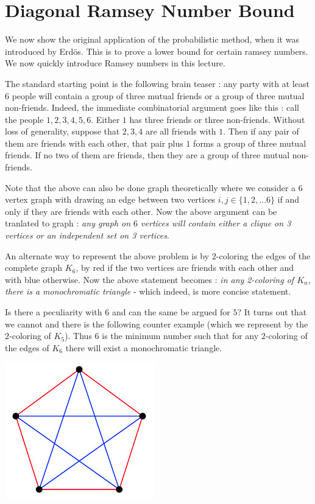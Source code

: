 \section{Diagonal Ramsey Number Bound}

We now show the original application of the probabilistic method, when it was introduced by Erd\"os. This is to prove a lower bound for certain ramsey numbers. We now quickly introduce Ramsey numbers in this lecture.

The standard starting point is the following brain teaser : any party with at least $6$ people will contain a group of three mutual friends or a group of three mutual non-friends. Indeed, the immediate combinatorial argument goes like this : call the people $1, 2, 3, 4, 5, 6$. Either $1$ has three friends or three non-friends. Without loss of generality, suppose that $2,3,4$ are all friends with $1$. Then if any pair of them are friends with each other, that pair plus $1$ forms a group of three mutual friends. If no two of them are friends, then they are a group of three mutual non-friends. 

Note that the above can also be done graph theoretically where we consider a 6 vertex graph with drawing an edge between two vertices $i,j \in \{1,2,\ldots 6\}$ if and only if they are friends with each other. Now the above argument can be tranlated to graph : \textit{any graph on $6$ vertices will contain either a clique on 3 vertices or an independent set on 3 vertices}.\\[-2mm]

\hspace{-6mm}\begin{minipage}{0.75\textwidth}
An alternate way to represent the above problem is by $2$-coloring the edges of the complete graph $K_6$, by red if the two vertices are friends with each other and with blue otherwise. Now the above statement becomes : {\em in any 2-coloring of $K_n$, there is a monochromatic triangle} - which indeed, is more concise statement.

Is there a peculiarity with $6$ and can the same be argued for $5$? It turns out that we cannot and there is the following counter example (which we represent by the $2$-coloring of $K_5$).
Thus $6$ is the minimum number such that for any $2$-coloring of the edges of $K_6$ there will exist a monochromatic triangle.
\end{minipage}
\begin{minipage}{0.15\textwidth}
\vspace{-3mm}
\includegraphics[scale=0.5]{ramsey.jpg}
\end{minipage}

